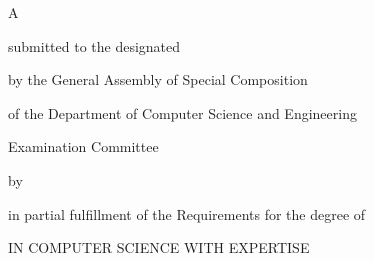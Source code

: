\makeatletter

{\LARGE \@title}

{\Large
	\vfill \vfill A \csethesisTypeEn

	\vfill        submitted to the designated

	\vfill        by the General Assembly of Special Composition

	              of the Department of Computer Science and Engineering

	              Examination Committee

	\vfill        by

	\vfill        {\LARGE \@author}

	\vfill        in partial fulfillment of the Requirements for the degree of

	\vfill        \csediplwmaEn

	              IN COMPUTER SCIENCE
	\ifPhD\else
		          WITH EXPERTISE
			
		          \@Ekseidikseusi
	\fi

	\vfill \vfill \@date
}

\clearpage
